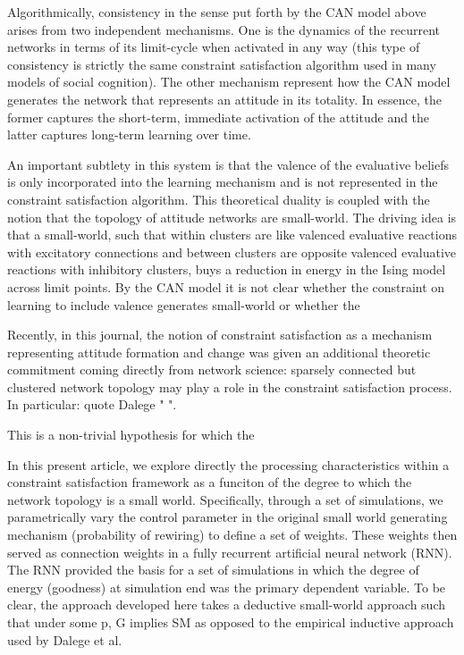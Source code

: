 \documentclass{article}
\begin{document}
Algorithmically, consistency in the sense put forth by the CAN model above arises from two independent mechanisms. One is the dynamics of the recurrent networks in terms of its limit-cycle when activated in any way (this type of consistency is strictly the same constraint satisfaction algorithm used in many models of social cognition).  The other mechanism represent how the CAN model generates the network that represents an attitude in its totality.  In essence, the former captures the short-term, immediate activation of the attitude and the latter captures long-term learning over time.

An important subtlety in this system is that the valence of the evaluative beliefs is only incorporated into the learning mechanism and is not represented in the constraint satisfaction algorithm.  This theoretical duality is coupled with the notion that the topology of attitude networks are small-world.  The driving idea is that a small-world, such that within clusters are like valenced evaluative reactions with excitatory connections and between clusters are opposite valenced evaluative reactions with inhibitory clusters, buys a reduction in energy in the Ising model across limit points.  By the CAN model it is not clear whether the constraint on learning to include valence generates small-world or whether the 




Recently, in this journal, the notion of constraint satisfaction as a mechanism representing attitude formation and change was given an additional theoretic commitment coming directly from network science:  sparsely connected but clustered network topology may play a role in the constraint satisfaction process.   In particular:  quote Dalege " ".

This is a non-trivial hypothesis for which the 

In this present article, we explore directly the processing characteristics within a constraint satisfaction framework as a funciton of the degree to which the network topology is a small world. Specifically, through a set of simulations, we parametrically vary the control parameter in the original small world generating mechanism (probability of rewiring) to define a set of weights.  These weights then served as connection weights in a fully recurrent artificial neural network (RNN).  The RNN provided the basis for a set of simulations in which the degree of energy (goodness) at simulation end was the primary dependent variable.  To be clear, the approach developed here takes a deductive small-world approach such that under some p, G implies SM as opposed to the empirical inductive approach used by Dalege et al. 
\end{document}
